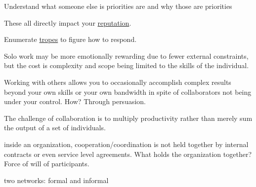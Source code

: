 Understand what someone else is priorities are and why those are priorities

These all directly impact your 
\hyperref[sec:reputation]{reputation}.

Enumerate \hyperref[sec:tropes]{tropes} to figure how to respond.


Solo work may be more emotionally rewarding due to fewer external constraints, but the cost is complexity and scope being limited to the skills of the individual. 

Working with others allows you to occasionally accomplish complex results beyond your own skills or your own bandwidth in spite of collaborators not being under your control. How? Through persuasion. 

The challenge of collaboration is to multiply productivity rather than merely sum the output of a set of individuals. 

inside an organization, cooperation/coordination is not held together by internal contracts or even service level agreements. What holds the organization together? Force of will of participants. 

two networks: formal and informal